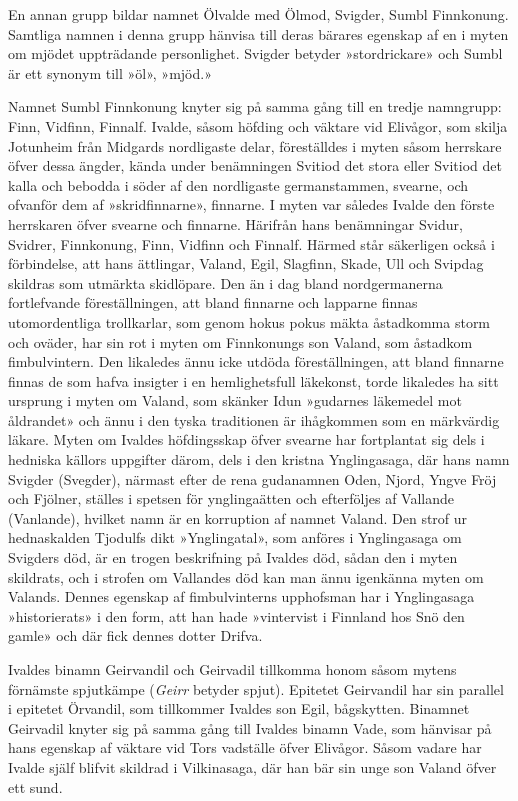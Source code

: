 En annan grupp bildar namnet Ölvalde med Ölmod, Svigder, Sumbl
Finnkonung. Samtliga namnen i denna grupp hänvisa till deras bärares
egenskap af en i myten om mjödet uppträdande personlighet. Svigder
betyder »stordrickare» och Sumbl är ett synonym till »öl», »mjöd.»

Namnet Sumbl Finnkonung knyter sig på samma gång till en tredje
namngrupp: Finn, Vidfinn, Finnalf. Ivalde, såsom höfding och väktare vid
Elivågor, som skilja Jotunheim från Midgards nordligaste delar,
föreställdes i myten såsom herrskare öfver dessa ängder, kända under
benämningen Svitiod det stora eller Svitiod det kalla och bebodda i
söder af den nordligaste germanstammen, svearne, och ofvanför dem af
»skridfinnarne», finnarne. I myten var således Ivalde den förste
herrskaren öfver svearne och finnarne. Härifrån hans benämningar Svidur,
Svidrer, Finnkonung, Finn, Vidfinn och Finnalf. Härmed står säkerligen
också i förbindelse, att hans ättlingar, Valand, Egil, Slagfinn, Skade,
Ull och Svipdag skildras som utmärkta skidlöpare. Den än i dag bland
nordgermanerna fortlefvande föreställningen, att bland finnarne och
lapparne finnas utomordentliga trollkarlar, som genom hokus pokus mäkta
åstadkomma storm och oväder, har sin rot i myten om Finnkonungs son
Valand, som åstadkom fimbulvintern. Den likaledes ännu icke utdöda
föreställningen, att bland finnarne finnas de som hafva insigter i en
hemlighetsfull läkekonst, torde likaledes ha sitt ursprung i myten om
Valand, som skänker Idun »gudarnes läkemedel mot åldrandet» och ännu i
den tyska traditionen är ihågkommen som en märkvärdig läkare. Myten om
Ivaldes höfdingsskap öfver svearne har fortplantat sig dels i hedniska
källors uppgifter därom, dels i den kristna Ynglingasaga, där hans namn
Svigder (Svegder), närmast efter de rena gudanamnen Oden, Njord, Yngve
Fröj och Fjölner, ställes i spetsen för ynglingaätten och efterföljes af
Vallande (Vanlande), hvilket namn är en korruption af namnet Valand. Den
strof ur hednaskalden Tjodulfs dikt »Ynglingatal», som anföres i
Ynglingasaga om Svigders död, är en trogen beskrifning på Ivaldes död,
sådan den i myten skildrats, och i strofen om Vallandes död kan man ännu
igenkänna myten om Valands. Dennes egenskap af fimbulvinterns upphofsman
har i Ynglingasaga »historierats» i den form, att han hade »vintervist i
Finnland hos Snö den gamle» och där fick dennes dotter Drifva.

Ivaldes binamn Geirvandil och Geirvadil tillkomma honom såsom mytens
förnämste spjutkämpe (\emph{Geirr} betyder spjut). Epitetet Geirvandil
har sin parallel i epitetet Örvandil, som tillkommer Ivaldes son Egil,
bågskytten. Binamnet Geirvadil knyter sig på samma gång till Ivaldes
binamn Vade, som hänvisar på hans egenskap af väktare vid Tors
vadställe\protect\hypertarget{lb1625905.xhtmlux5cux23start227}{}{}\protect\hypertarget{lb1625905.xhtmlux5cux23start227-a}{}{}\protect\hypertarget{lb1625905.xhtmlux5cux23start227-b}{}{}\protect\hypertarget{lb1625905.xhtmlux5cux23start227-c}{}{}\protect\hypertarget{lb1625905.xhtmlux5cux23start227-d}{}{}
öfver Elivågor. Såsom vadare har Ivalde själf blifvit skildrad i
Vilkinasaga, där han bär sin unge son Valand öfver ett sund.

